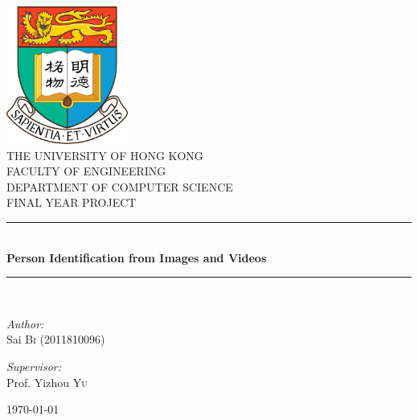 \documentclass[pdftex,12pt,a4paper]{report}
\newcommand{\HRule}{\rule{\linewidth}{0.5mm}}
\begin{document}
\renewcommand{\bibname}{References}

\begin{titlepage}
\begin{center}

\includegraphics[width=0.3\textwidth]{./res/hku-logo}~\\[1cm]

\uppercase{\LARGE The University of Hong Kong}\\[0.5cm]
\uppercase{\LARGE Faculty of Engineering}\\[0.5cm]
\uppercase{\LARGE Department of Computer Science}\\[1.5cm]

\uppercase{\Large Final Year Project}\\[0.5cm]

\HRule \\[0.4cm]
{ \huge \bfseries Person Identification from Images and Videos \\[0.4cm] }

\HRule \\[1.5cm]

\begin{minipage}{0.4\textwidth}
\begin{flushleft} \large
\emph{Author:}\\
Sai \textsc{Bi} (2011810096)
\end{flushleft}
\end{minipage}
\begin{minipage}{0.4\textwidth}
\begin{flushright} \large
\emph{Supervisor:} \\
Prof. Yizhou \textsc{Yu}
\end{flushright}
\end{minipage}

\vfill

{\large \today}

\end{center}
\end{titlepage}
\end{document}

